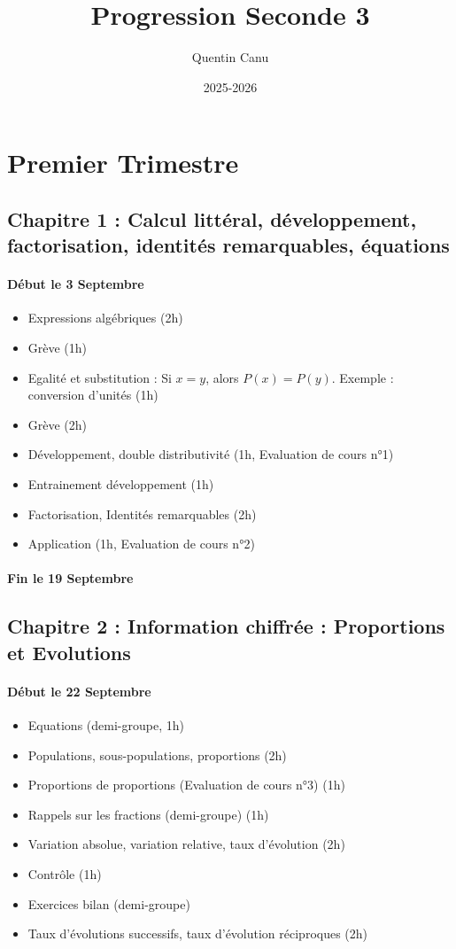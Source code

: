 \documentclass{article}
\title{Progression Seconde 3}
\date{2025-2026}
\author{Quentin Canu}
\begin{document}
\maketitle
\section{Premier Trimestre}
\subsection*{Chapitre 1 : Calcul littéral, développement, factorisation, identités remarquables, équations}
\paragraph{Début le 3 Septembre}
\begin{itemize}
\item Expressions algébriques (2h) 
\item Grève (1h)
\item Egalité et substitution : Si $x = y$, alors $P(x) = P(y)$. Exemple : conversion d'unités (1h)
\item Grève (2h)
\item Développement, double distributivité (1h, Evaluation de cours n°1)
\item Entrainement développement (1h)
\item Factorisation, Identités remarquables (2h)
\item Application (1h, Evaluation de cours n°2)
\end{itemize}
\paragraph{Fin le 19 Septembre}
\subsection*{Chapitre 2 : Information chiffrée : Proportions et Evolutions}
\paragraph{Début le 22 Septembre}
\begin{itemize}
\item Equations (demi-groupe, 1h)
\item Populations, sous-populations, proportions (2h)
\item Proportions de proportions (Evaluation de cours n°3) (1h)
\item Rappels sur les fractions (demi-groupe) (1h)
\item Variation absolue, variation relative, taux d'évolution (2h)
\item Contrôle (1h) 
\item Exercices bilan (demi-groupe)
\item Taux d'évolutions successifs, taux d'évolution réciproques (2h)
\end{itemize}
\end{document}
